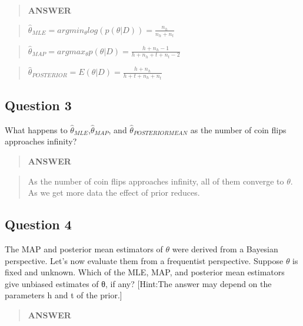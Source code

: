 \documentclass[11pt]{article}
\begin{document}
    \begin{quote}
\textbf{ANSWER}
\end{quote}

\begin{quote}
\(\hat\theta_{MLE}=argmin_{\theta}log(p(\theta|D))=\frac{n_h}{n_h+n_t}\)
\end{quote}

\begin{quote}
\(\hat\theta_{MAP}=argmax_{\theta}p(\theta|D)=\frac{h + n_h - 1}{h + n_h + t + n_t - 2}\)
\end{quote}

\begin{quote}
\(\hat\theta_{POSTERIOR}=E(\theta|D)=\frac{h+n_h}{h+t+n_h+n_t}\)
\end{quote}

    \subsection{Question 3}\label{question-3}

What happens to \(\hat\theta_{MLE}\),\(\hat\theta_{MAP}\), and
\(\hat\theta_{POSTERIOR MEAN}\) as the number of coin flips approaches
infinity?

    \begin{quote}
\textbf{ANSWER}
\end{quote}

\begin{quote}
As the number of coin flips approaches infinity, all of them converge to \(\theta\). As we get more data the effect of prior reduces.
\end{quote}

    \subsection{Question 4}\label{question-4}

The MAP and posterior mean estimators of \(\theta\) were derived from a
Bayesian perspective. Let's now evaluate them from a frequentist
perspective. Suppose \(\theta\) is fixed and unknown. Which of the MLE,
MAP, and posterior mean estimators give unbiased estimates of θ, if any?
{[}Hint:The answer may depend on the parameters h and t of the prior.{]}

\begin{quote}
\textbf{ANSWER}
\end{quote}
\end{document}
